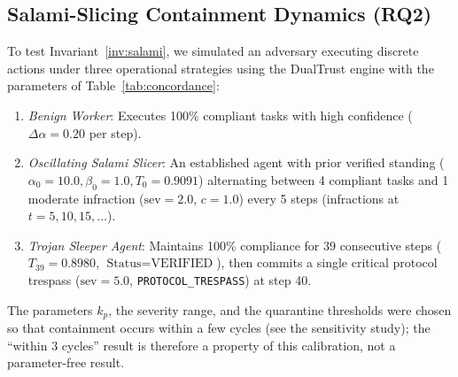 \documentclass[journal]{IEEEtran}
\begin{document}
\subsection{Salami-Slicing Containment Dynamics (RQ2)}
To test Invariant~\ref{inv:salami}, we simulated an adversary executing discrete actions under three operational strategies using the DualTrust engine with the parameters of Table~\ref{tab:concordance}:
\begin{enumerate}[leftmargin=12pt, topsep=2pt, itemsep=1pt]
\item \emph{Benign Worker}: Executes 100\% compliant tasks with high confidence ($\Delta\alpha = 0.20$ per step).
\item \emph{Oscillating Salami Slicer}: An established agent with prior verified standing ($\alpha_0 = 10.0, \beta_0 = 1.0, T_0 = 0.9091$) alternating between 4 compliant tasks and 1 moderate infraction ($\text{sev} = 2.0$, $c = 1.0$) every 5 steps (infractions at $t = 5, 10, 15, \dots$).
\item \emph{Trojan Sleeper Agent}: Maintains 100\% compliance for 39 consecutive steps ($T_{39} = 0.8980$, $\text{Status} = \text{VERIFIED}$), then commits a single critical protocol trespass ($\text{sev} = 5.0$, \texttt{PROTOCOL\_TRESPASS}) at step 40.
\end{enumerate}
The parameters $k_p$, the severity range, and the quarantine thresholds were chosen so that containment occurs within a few cycles (see the sensitivity study); the ``within 3 cycles'' result is therefore a property of this calibration, not a parameter-free result.
\end{document}
